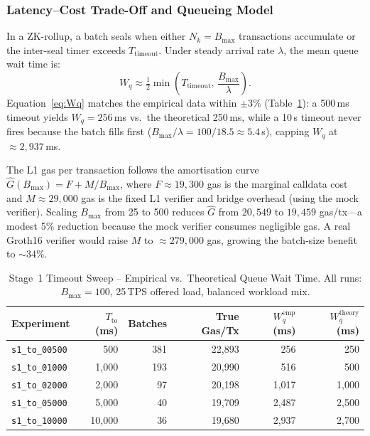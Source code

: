 \subsubsection{Latency--Cost Trade-Off and Queueing Model}

In a ZK-rollup, a batch seals when either $N_k = B_{\max}$ transactions
accumulate or the inter-seal timer exceeds $T_{\mathrm{timeout}}$.  Under
steady arrival rate $\lambda$, the mean queue wait time is:
\begin{equation}
  W_q \approx \tfrac{1}{2}\min\!\left(T_{\mathrm{timeout}},\,
    \frac{B_{\max}}{\lambda}\right).
  \label{eq:Wq}
\end{equation}
Equation~\eqref{eq:Wq} matches the empirical data within $\pm3\%$
(Table~\ref{tab:s1_timeout}): a 500\,ms timeout yields $W_q=256$\,ms vs.\ the
theoretical 250\,ms, while a 10\,s timeout never fires because the batch fills
first ($B_{\max}/\lambda=100/18.5\approx5.4$\,s), capping $W_q$ at ${\approx}2{,}937$\,ms.

The L1 gas per transaction follows the amortisation curve
$\hat{G}(B_{\max})= F + M/B_{\max}$, where $F\approx19{,}300$ gas is the marginal
calldata cost and $M\approx29{,}000$ gas is the fixed L1 verifier and bridge overhead
(using the mock verifier).  Scaling $B_{\max}$ from 25 to 500 reduces $\hat{G}$
from $20{,}549$ to $19{,}459$ gas/tx---a modest 5\% reduction because the mock
verifier consumes negligible gas.  A real Groth16 verifier would raise $M$ to
${\approx}279{,}000$ gas, growing the batch-size benefit to ${\sim}34\%$.

\begin{table}[htbp]
\centering
\caption{Stage~1 Timeout Sweep -- Empirical vs.\ Theoretical Queue Wait Time.
All runs: $B_{\max}=100$, 25\,TPS offered load, balanced workload mix.}
\label{tab:s1_timeout}
\setlength{\tabcolsep}{4pt}
\begin{tabular}{lrrrrr}
\toprule
Experiment & $T_{\mathrm{to}}$ (ms) & Batches & True Gas/Tx & $W_q^{\mathrm{emp}}$ (ms) & $W_q^{\mathrm{theory}}$ (ms) \\
\midrule
\texttt{s1\_to\_00500} & 500    & 381 & 22{,}893 & 256   & 250   \\
\texttt{s1\_to\_01000} & 1{,}000 & 193 & 20{,}990 & 516   & 500   \\
\texttt{s1\_to\_02000} & 2{,}000 & 97  & 20{,}198 & 1{,}017 & 1{,}000 \\
\texttt{s1\_to\_05000} & 5{,}000 & 40  & 19{,}709 & 2{,}487 & 2{,}500 \\
\texttt{s1\_to\_10000} & 10{,}000& 36  & 19{,}680 & 2{,}937 & 2{,}700 \\
\bottomrule
\end{tabular}
\end{table}

